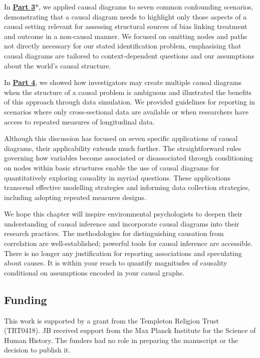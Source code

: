 \documentclass[
  singlecolumn]{article}
\begin{document}
In \hyperref[section-part3]{\textbf{Part 3}}*, we applied causal
diagrams to seven common confounding scenarios, demonstrating that a
causal diagram needs to highlight only those aspects of a causal setting
relevant for assessing structural sources of bias linking treatment and
outcome in a non-causal manner. We focused on omitting nodes and paths
not directly necessary for our stated identification problem,
emphasising that causal diagrams are tailored to context-dependent
questions and our assumptions about the world's causal structure.

In \hyperref[section-part4]{\textbf{Part 4}}, we showed how
investigators may create multiple causal diagrams when the structure of
a causal problem is ambiguous and illustrated the benefits of this
approach through data simulation. We provided guidelines for reporting
in scenarios where only cross-sectional data are available or when
researchers have access to repeated measures of longitudinal data.

Although this discussion has focused on seven specific applications of
causal diagrams, their applicability extends much further. The
straightforward rules governing how variables become associated or
disassociated through conditioning on nodes within basic structures
enable the use of causal diagrams for quantitatively exploring causality
in myriad questions. These applications transcend effective modelling
strategies and informing data collection strategies, including adopting
repeated measures designs.

We hope this chapter will inspire environmental psychologists to deepen
their understanding of causal inference and incorporate causal diagrams
into their research practices. The methodologies for distinguishing
causation from correlation are well-established; powerful tools for
causal inference are accessible. There is no longer any justification
for reporting associations and speculating about causes. It is within
your reach to quantify magnitudes of causality conditional on
assumptions encoded in your causal graphs.

\newpage{}

\subsection{Funding}\label{funding}

This work is supported by a grant from the Templeton Religion Trust
(TRT0418). JB received support from the Max Planck Institute for the
Science of Human History. The funders had no role in preparing the
manuscript or the decision to publish it.
\end{document}
